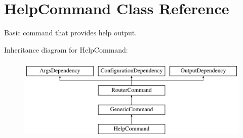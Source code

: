 \hypertarget{classHelpCommand}{\section{Help\-Command Class Reference}
\label{classHelpCommand}
}


Basic command that provides help output.  


Inheritance diagram for Help\-Command\-:\begin{figure}[H]
\begin{center}
\leavevmode
\includegraphics[height=4.000000cm]{classHelpCommand}
\end{center}
\end{figure}
